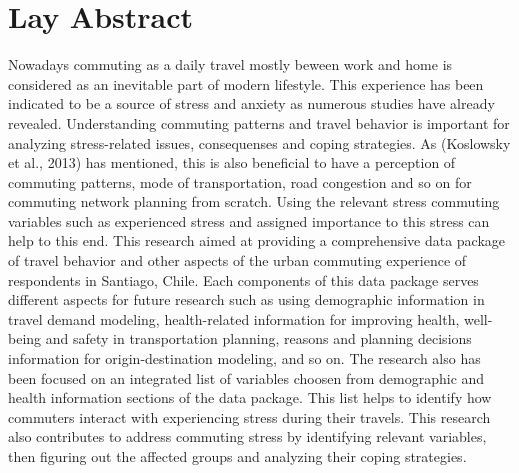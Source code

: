 \documentclass[
11pt, %
oneside, %
english, %
singlespacing, %
]{macthesis} %
\def\blankpage{%
      \clearpage%
      \thispagestyle{empty}%
      \addtocounter{page}{-1}%
      \null%
      \clearpage}
\begin{document}
\section*{Lay Abstract}
  Nowadays commuting as a daily travel mostly beween work and home is considered as an inevitable part of modern lifestyle. This experience has been indicated to be a source of stress and anxiety as numerous studies have already revealed. Understanding commuting patterns and travel behavior is important for analyzing stress-related issues, consequenses and coping strategies. As (Koslowsky et al., 2013) has mentioned, this is also beneficial to have a perception of commuting patterns, mode of transportation, road congestion and so on for commuting network planning from scratch. Using the relevant stress commuting variables such as experienced stress and assigned importance to this stress can help to this end.
  This research aimed at providing a comprehensive data package of travel behavior and other aspects of the urban commuting experience of respondents in Santiago, Chile. Each components of this data package serves different aspects for future research such as using demographic information in travel demand modeling, health-related information for improving health, well-being and safety in transportation planning, reasons and planning decisions information for origin-destination modeling, and so on.
  The research also has been focused on an integrated list of variables choosen from demographic and health information sections of the data package. This list helps to identify how commuters interact with experiencing stress during their travels. This research also contributes to address commuting stress by identifying relevant variables, then figuring out the affected groups and analyzing their coping strategies.
\blankpage
\clearpage


\end{document}
